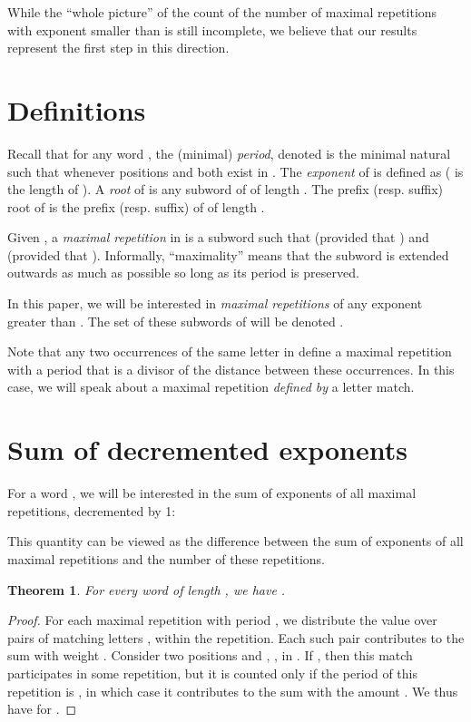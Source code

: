 \documentclass[11pt]{article}
\newtheorem{theorem}{Theorem}
\begin{document}
While the ``whole picture'' of the count of the number of maximal
repetitions with exponent smaller than  is still incomplete, we
believe that our results represent the first step in this direction. 

\section{Definitions}
Recall that for any word , the (minimal) {\em period}, denoted  is
the minimal natural  such that  whenever positions 
and  both exist in .
The {\em exponent} of  is defined as  ( is
the length of ). 
A {\em root} of  is any subword of  of length . The
prefix (resp. suffix) root of  is the prefix (resp. suffix) of 
of length .

Given , a {\em maximal repetition} in  is a subword 
such that  (provided that ) and
 (provided that ). Informally,
``maximality'' means that the subword is extended outwards as much
as possible so long as its period is preserved. 

In this paper, we will be interested in {\em maximal repetitions} of
any exponent greater than . The set of these subwords of  will
be denoted . 

Note that any two occurrences of the same letter in  define a
maximal repetition with a period that is a divisor of the distance
between these occurrences. In this case, we will speak about a maximal repetition
{\em defined by} a letter match. 




\section{Sum of decremented exponents}
\label{sum}

For a word , we will be interested in the sum of exponents of all
maximal repetitions, decremented by 1:

This quantity can be viewed as the difference between the sum of
exponents of all maximal repetitions and the number of these
repetitions. 

\begin{theorem}
\label{t1}
For every word  of length , we have .
\end{theorem}
\begin{proof}
For each maximal repetition  with period , we distribute the value 
over  pairs of matching letters , 
within the repetition. Each such pair contributes to the sum
with weight . 
Consider two positions  and , , in . 
If , then this match participates in some repetition, but it
is counted only if the period of this repetition is , in which
case it
contributes to the sum with the amount 
. 
We thus have  for .
\end{proof}
\end{document}

